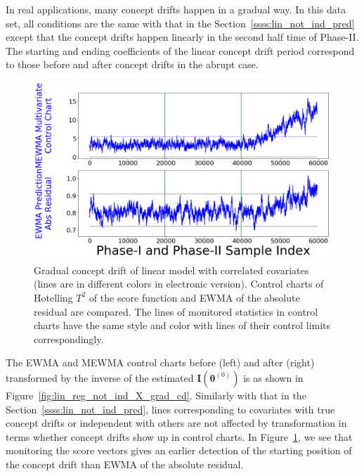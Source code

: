 \documentclass[twoside,11pt]{article}
\begin{document}
\begin{enumerate}[(I)]
In real applications, many concept drifts happen in a gradual way. In this data set, all conditions are the same with that in the Section~\ref{ssss:lin_not_ind_pred} except that the concept drifts happen linearly in the second half time of Phase-II. The starting and ending coefficients of the linear concept drift period correspond to those before and after concept drifts in the abrupt case. 
\begin{figure}[!htbp]
\centering
\includegraphics[width = 0.6\linewidth]{../figures/v14/sim_6/reg/1_sim6_lin_1e-08_0_005_1.png}
  \caption{Gradual concept drift of linear model with correlated covariates (lines are in different colors in electronic version). Control charts of Hotelling $T^2$ of the score function and EWMA of the absolute residual are compared. The lines of monitored statistics in control charts have the same style and color with lines of their control limits correspondingly.}
  \label{fig:lin_reg_ind_X_grad_cd_comp}
\end{figure}

The EWMA and MEWMA control charts before (left) and after (right) transformed by {the inverse of the estimated} ${\mathbf {I}}(\bm { \theta}^{(0)})$ is as shown in Figure~\ref{fig:lin_reg_not_ind_X_grad_cd}. Similarly with that in the Section~\ref{ssss:lin_not_ind_pred}, lines corresponding to covariates with true concept drifts or independent with others are not affected by transformation in terms whether concept drifts show up in control charts. In Figure~\ref{fig:lin_reg_ind_X_grad_cd_comp}, we see that monitoring the score vectors gives an earlier detection of the starting position of the concept drift than EWMA of the absolute residual.
\end{enumerate}
\end{document}
